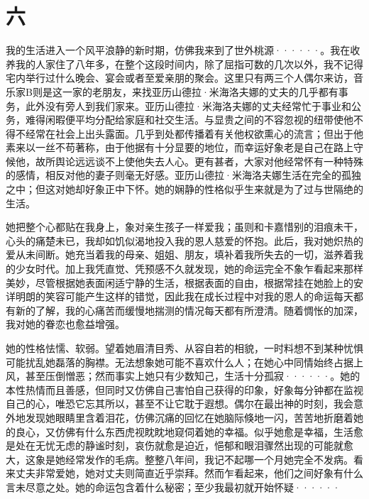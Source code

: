 \documentclass[12pt, UTF8]{ctexbook}
\begin{document}
\section*{六}
\par 我的生活进入一个风平浪静的新时期，仿佛我来到了世外桃源······。我在收养我的人家住了八年多，在整个这段时间内，除了屈指可数的几次以外，我不记得宅内举行过什么晚会、宴会或者至爱亲朋的聚会。这里只有两三个人偶尔来访，音乐家B则是这一家的老朋友，来找亚历山德拉·米海洛夫娜的丈夫的几乎都有事务，此外没有旁人到我们家来。亚历山德拉·米海洛夫娜的丈夫经常忙于事业和公务，难得闲暇便平均分配给家庭和社交生活。与显贵之间的不容忽视的纽带使他不得不经常在社会上出头露面。几乎到处都传播着有关他权欲熏心的流言；但出于他素来以一丝不苟著称，由于他据有十分显要的地位，而幸运好象老是自己在路上守候他，故所舆论远远谈不上使他失去人心。更有甚者，大家对他经常怀有一种特殊的感情，相反对他的妻子则毫无好感。亚历山德拉·米海洛夫娜生活在完全的孤独之中；但这对她却好象正中下怀。她的娴静的性格似乎生来就是为了过与世隔绝的生活。
\par 她把整个心都贴在我身上，象对亲生孩子一样爱我；虽则和卡嘉惜别的泪痕未干，心头的痛楚未已，我却如饥似渴地投入我的恩人慈爱的怀抱。此后，我对她炽热的爱从未间断。她充当着我的母亲、姐姐、朋友，填补着我所失去的一切，滋养着我的少女时代。加上我凭直觉、凭预感不久就发现，她的命运完全不象乍看起来那样美妙，尽管根据她表面闲适宁静的生活，根据表面的自由，根据常挂在她脸上的安详明朗的笑容可能产生这样的错觉，因此我在成长过程中对我的恩人的命运每天都有新的了解，我的心痛苦而缓慢地揣测的情况每天都有所澄清。随着惆怅的加深，我对她的眷恋也愈益增强。
\par 她的性格怯懦、软弱。望着她眉清目秀、从容自若的相貌，一时料想不到某种忧惧可能扰乱她磊落的胸襟。无法想象她可能不喜欢什么人；在她心中同情始终占据上风，甚至压倒憎恶；然而事实上她只有少数知己，生活十分孤寂······。她的本性热情而且善感，但同时又仿佛自己害怕自己获得的印象，好象每分钟都在监视自己的心，唯恐它忘其所以，甚至不让它耽于遐想。偶尔在最出神的时刻，我会意外地发现她眼睛里含着泪花，仿佛沉痛的回忆在她脑际倏地一闪，苦苦地折磨着她的良心，又仿佛有什么东西虎视眈眈地窥伺着她的幸福。似乎她愈是幸福，生活愈是处在无忧无虑的静谧时刻，哀伤就愈是迫近，悒郁和眼泪骤然出现的可能就愈大，这象是她经常发作的毛病。整整八年间，我记不起哪一个月她完全不发病。看来丈夫非常爱她，她对丈夫则简直近乎崇拜。然而乍看起来，他们之间好象有什么言未尽意之处。她的命运包含着什么秘密；至少我最初就开始怀疑······
\end{document}
